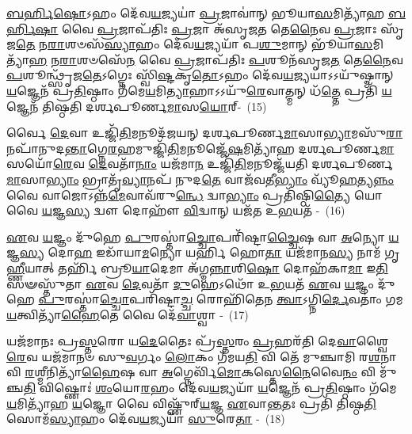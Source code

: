 {\anuvakamend[{\-\ul{𑌅}\-\-\ul{𑌨𑍍𑌵𑌾}\-\-\ul{𑌹𑌾}\-𑌰𑍍𑌯𑍇᳴𑌣 \ul{𑌪𑍍𑌰}\-𑌜𑌾𑌪᳴𑌤𑍇𑌰\-\ul{𑌸𑌿} 𑌹𑍍𑌯᳴𑌮𑍁𑌷𑍍𑌮𑌿᳴\-\ul{𑌲𑍍𑌲𑍋𑌁}\-𑌕𑍇 𑌪𑌞𑍍𑌚᳴𑌦𑌶 𑌚}]}%

\-\ul{𑌬}\-\-\ul{𑌰𑍍}\-\mbox{}𑌹𑌿\-\ul{𑌷𑍋}\-\-𑌽𑌹𑌂 𑌦𑍇᳴𑌵\-\ul{𑌯}\-𑌜𑍍𑌯𑌯𑌾॑ \ul{𑌪𑍍𑌰}\-𑌜𑌾𑌵𑌾॑𑌨𑍍 𑌭𑍂𑌯𑌾\-\ul{𑌸}\-𑌮𑌿𑌤𑍍𑌯𑌾᳴𑌹 \ul{𑌬}\-\-\ul{𑌰𑍍}\-\mbox{}𑌹𑌿\-\ul{𑌷𑌾} 𑌵𑍈 \ul{𑌪𑍍𑌰}\-𑌜𑌾𑌪᳴𑌤𑌿𑌃 \ul{𑌪𑍍𑌰}\-𑌜𑌾 𑌅᳴𑌸𑍃𑌜\-\ul{𑌤} 𑌤𑍇\-\ul{𑌨𑍈}\-𑌵 \ul{𑌪𑍍𑌰}\-𑌜𑌾𑌃 𑌸𑍃᳴𑌜\-\ul{𑌤𑍇} 𑌨\-\ul{𑌰𑌾}\-𑌶𑍞𑌸᳴\-\ul{𑌸𑍍𑌯𑌾}\-𑌹𑌂 𑌦𑍇᳴𑌵\-\ul{𑌯}\-𑌜𑍍𑌯𑌯𑌾᳴ 𑌪\-\ul{𑌶𑍁}\-𑌮𑌾𑌨𑍍 𑌭𑍂᳴𑌯𑌾\-\ul{𑌸}\-𑌮𑌿𑌤𑍍𑌯𑌾᳴\-\ul{𑌹} 𑌨\-\ul{𑌰𑌾}\-𑌶𑍞𑌸𑍇᳴\-\ul{𑌨} 𑌵𑍈 \ul{𑌪𑍍𑌰}\-𑌜𑌾𑌪᳴𑌤𑌿𑌃 \ul{𑌪}\-𑌶𑍂𑌨᳴𑌸𑍃𑌜\-\ul{𑌤} 𑌤𑍇\-\ul{𑌨𑍈}\-𑌵 \ul{𑌪}\-𑌶𑍂𑌨𑍍𑌥𑍍𑌸𑍃᳴𑌜\-\ul{𑌤𑍇}\-\-𑌽𑌗𑍍𑌨𑍇𑌃 𑌸𑍍𑌵𑌿᳴\-\ul{𑌷𑍍𑌟}\-𑌕𑍃\-\ul{𑌤𑍋}\-\-𑌽𑌹𑌂 𑌦𑍇᳴𑌵\-\ul{𑌯}\-𑌜𑍍𑌯𑌯𑌾\-𑌽\-𑌽𑌯𑍁᳴𑌷𑍍𑌮𑌾𑌨𑍍 \ul{𑌯}\-𑌜𑍍𑌞𑍇𑌨᳴ 𑌪𑍍𑌰\-\ul{𑌤𑌿}\-𑌷𑍍𑌠𑌾𑌂 𑌗᳴𑌮𑍇\-\ul{𑌯}\-𑌮𑌿\-\ul{𑌤𑍍𑌯𑌾}\-𑌹𑌾\-𑌽\-𑌽𑌯𑍁᳴\-\ul{𑌰𑍇}\-𑌵𑌾𑌤𑍍𑌮𑌨𑍍 𑌧᳴\-\ul{𑌤𑍍𑌤𑍇} 𑌪𑍍𑌰𑌤𑌿᳴ \ul{𑌯}\-𑌜𑍍𑌞𑍇𑌨᳴ 𑌤𑌿𑌷𑍍𑌠𑌤𑌿 𑌦𑌰𑍍\mbox{}𑌶𑌪𑍂𑌰𑍍𑌣\-\ul{𑌮𑌾}\-𑌸\-\ul{𑌯𑍋}\-𑌰𑍍-~(15)

𑌰𑍍𑌵𑍈 \ul{𑌦𑍇}\-𑌵𑌾 𑌉𑌜𑍍𑌜𑌿᳴\-\ul{𑌤𑌿}\-𑌮𑌨𑍂𑌦᳴𑌜𑌯𑌨𑍍 𑌦𑌰𑍍\mbox{}𑌶𑌪𑍂𑌰𑍍𑌣\-\ul{𑌮𑌾}\-𑌸𑌾\-\ul{𑌭𑍍𑌯𑌾}\-𑌮𑌸𑍁᳴\-\ul{𑌰𑌾}\-𑌨𑌪𑌾᳴\-𑌨𑍁𑌦\-\ul{𑌨𑍍𑌤𑌾}\-𑌗𑍍𑌨𑍇\-\ul{𑌰}\-𑌹\-𑌮𑍁𑌜𑍍𑌜𑌿᳴\-\ul{𑌤𑌿}\-\-𑌮𑌨𑍂𑌜𑍍𑌜𑍇᳴\-\ul{𑌷}\-𑌮𑌿𑌤𑍍𑌯𑌾᳴𑌹 𑌦𑌰𑍍\mbox{}𑌶𑌪𑍂𑌰𑍍𑌣\-\ul{𑌮𑌾}\-𑌸𑌯𑍋᳴\-\ul{𑌰𑍇}\-𑌵 \ul{𑌦𑍇}\-𑌵𑌤𑌾᳴\-\ul{𑌨𑌾𑌂} 𑌯𑌜᳴𑌮𑌾\-\ul{𑌨} 𑌉𑌜𑍍𑌜𑌿᳴\-\ul{𑌤𑌿}\-𑌮𑌨𑍂𑌜𑍍𑌜᳴𑌯𑌤𑌿 𑌦𑌰𑍍\mbox{}𑌶𑌪𑍂𑌰𑍍𑌣\-\ul{𑌮𑌾}\-𑌸𑌾\-\ul{𑌭𑍍𑌯𑌾𑌂} 𑌭𑍍𑌰𑌾𑌤𑍃᳴\-\ul{𑌵𑍍𑌯𑌾}\-𑌨𑌪᳴ 𑌨𑍁𑌦\-\ul{𑌤𑍇} 𑌵𑌾𑌜᳴𑌵𑌤𑍀\-\ul{𑌭𑍍𑌯𑌾𑌂} 𑌵𑍍𑌯𑍂᳴\-\ul{𑌹}\-𑌤𑍍𑌯\-\ul{𑌨𑍍𑌨𑌂} 𑌵𑍈 𑌵𑌾𑌜𑍋\-𑌽𑌨𑍍𑌨᳴\-\ul{𑌮𑍇}\-𑌵𑌾𑌵᳴\-𑌰𑍁\-\ul{𑌨𑍍𑌧𑍇} 𑌦𑍍𑌵𑌾\-\ul{𑌭𑍍𑌯𑌾𑌂} 𑌪𑍍𑌰𑌤𑌿᳴𑌷𑍍𑌠𑌿\-\ul{𑌤𑍍𑌯𑍈} 𑌯𑍋 𑌵𑍈 \ul{𑌯}\-𑌜𑍍𑌞\-\ul{𑌸𑍍𑌯} 𑌦𑍍𑌵𑍗 𑌦𑍋𑌹𑍗᳴ \ul{𑌵𑌿}\-𑌦𑍍𑌵𑌾𑌨𑍍 𑌯𑌜᳴𑌤 𑌉\-\ul{𑌭}\-𑌯𑌤᳴ -~(16)

\-\ul{𑌏}\-𑌵 \ul{𑌯}\-𑌜𑍍𑌞𑌂 𑌦𑍁᳴𑌹𑍇 \ul{𑌪𑍁}\-𑌰𑌸𑍍𑌤𑌾॑\-\ul{𑌚𑍍𑌚𑍋}\-𑌪𑌰𑌿᳴𑌷𑍍𑌟𑌾\-\ul{𑌚𑍍𑌚𑍈}\-𑌷 𑌵𑌾 \ul{𑌅}\-𑌨𑍍𑌯𑍋 \ul{𑌯}\-𑌜𑍍𑌞\-\ul{𑌸𑍍𑌯} 𑌦𑍋\-\ul{𑌹} 𑌇𑌡𑌾᳴𑌯𑌾\-\ul{𑌮}\-𑌨𑍍𑌯𑍋 𑌯𑌰𑍍\mbox{}\-\ul{𑌹𑌿} 𑌹𑍋\-\ul{𑌤𑌾} 𑌯𑌜᳴𑌮𑌾𑌨\-\ul{𑌸𑍍𑌯} 𑌨𑌾𑌮᳴ 𑌗𑍃\-\ul{𑌹𑍍𑌣𑍀}\-𑌯𑌾𑌤𑍍 𑌤𑌰𑍍\mbox{}𑌹𑌿᳴ 𑌬𑍍𑌰𑍂\-\ul{𑌯𑌾}\-𑌦𑍇𑌮𑌾 𑌅᳴𑌗𑍍𑌮\-\ul{𑌨𑍍𑌨𑌾}\-𑌶𑌿\-\ul{𑌷𑍋} 𑌦𑍋𑌹᳴𑌕𑌾\-\ul{𑌮𑌾} 𑌇\-\ul{𑌤𑌿} 𑌸𑍟𑌸𑍍𑌤𑍁᳴𑌤𑌾 \ul{𑌏}\-𑌵 \ul{𑌦𑍇}\-𑌵𑌤𑌾᳴ \ul{𑌦𑍁}\-𑌹𑍇\-𑌽𑌥𑍋᳴ 𑌉\-\ul{𑌭}\-𑌯𑌤᳴ \ul{𑌏}\-𑌵 \ul{𑌯}\-𑌜𑍍𑌞𑌂 𑌦𑍁᳴𑌹𑍇 \ul{𑌪𑍁}\-𑌰𑌸𑍍𑌤𑌾॑\-\ul{𑌚𑍍𑌚𑍋}\-𑌪𑌰𑌿᳴𑌷𑍍𑌟𑌾\-\ul{𑌚𑍍𑌚} 𑌰𑍋𑌹𑌿᳴𑌤𑍇𑌨 \ul{𑌤𑍍𑌵𑌾}\-\-𑌽𑌗𑍍𑌨𑌿\-\ul{𑌰𑍍𑌦𑍇}\-𑌵𑌤𑌾𑌂॑ 𑌗𑌮\-\ul{𑌯}\-𑌤𑍍𑌵𑌿𑌤𑍍𑌯𑌾᳴\-\ul{𑌹𑍈}\-𑌤𑍇 𑌵𑍈 𑌦𑍇᳴\-\ul{𑌵𑌾}\-𑌶𑍍𑌵𑌾 -~(17)

𑌯𑌜᳴𑌮𑌾𑌨𑌃 𑌪𑍍𑌰\-\ul{𑌸𑍍𑌤}\-𑌰𑍋 𑌯\-\ul{𑌦𑍇}\-𑌤𑍈𑌃 𑌪𑍍𑌰᳴\-\ul{𑌸𑍍𑌤}\-𑌰𑌂 \ul{𑌪𑍍𑌰}\-𑌹𑌰᳴𑌤𑌿 𑌦𑍇\-\ul{𑌵𑌾}\-𑌶𑍍𑌵𑍈\-\ul{𑌰𑍇}\-𑌵 𑌯𑌜᳴𑌮𑌾𑌨𑍞 𑌸𑍁\-\ul{𑌵}\-𑌰𑍍𑌗𑌂 \ul{𑌲𑍋}\-𑌕𑌂 𑌗᳴𑌮𑌯\-\ul{𑌤𑌿} 𑌵𑌿 𑌤𑍇᳴ 𑌮𑍁𑌞𑍍𑌚𑌾𑌮𑌿 𑌰\-\ul{𑌶}\-𑌨𑌾 𑌵𑌿 \ul{𑌰}\-𑌶𑍍𑌮𑍀𑌨𑌿𑌤𑍍𑌯𑌾᳴\-\ul{𑌹𑍈}\-𑌷 𑌵𑌾 \ul{𑌅}\-𑌗𑍍𑌨𑍇𑌰𑍍𑌵𑌿᳴\-\ul{𑌮𑍋}\-𑌕𑌸𑍍𑌤𑍇\-\ul{𑌨𑍈}\-𑌵𑍈\-\ul{𑌨𑌂} 𑌵𑌿 𑌮𑍁᳴𑌞𑍍𑌚\-\ul{𑌤𑌿} 𑌵𑌿𑌷𑍍𑌣𑍋𑌃॑ \ul{𑌶𑌂}\-𑌯𑍋\-\ul{𑌰}\-𑌹𑌂 𑌦𑍇᳴𑌵\-\ul{𑌯}\-𑌜𑍍𑌯𑌯𑌾᳴ \ul{𑌯}\-𑌜𑍍𑌞𑍇𑌨᳴ 𑌪𑍍𑌰\-\ul{𑌤𑌿}\-𑌷𑍍𑌠𑌾𑌂 𑌗᳴𑌮𑍇\-\ul{𑌯}\-𑌮𑌿𑌤𑍍𑌯𑌾᳴𑌹 \ul{𑌯}\-𑌜𑍍𑌞𑍋 𑌵𑍈 𑌵𑌿𑌷𑍍𑌣𑍁᳴𑌰𑍍‌\-\ul{𑌯}\-𑌜𑍍𑌞 \ul{𑌏}\-𑌵𑌾\-\ul{𑌨𑍍𑌤}\-𑌤𑌃 𑌪𑍍𑌰𑌤𑌿᳴ 𑌤𑌿𑌷𑍍𑌠\-\ul{𑌤𑌿} 𑌸𑍋𑌮᳴\-\ul{𑌸𑍍𑌯𑌾}\-𑌹𑌂 𑌦𑍇᳴𑌵\-\ul{𑌯}\-𑌜𑍍𑌯𑌯𑌾᳴ \ul{𑌸𑍁}\-𑌰𑍇\-\ul{𑌤𑌾} -~(18)

